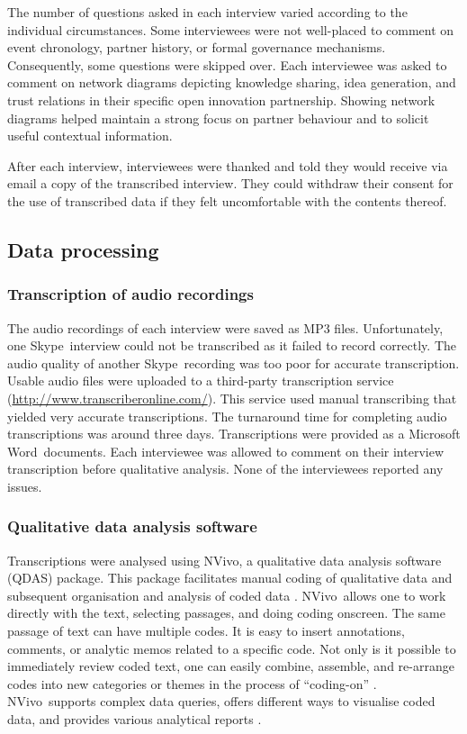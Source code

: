 The number of questions asked in each interview varied according to the individual circumstances. Some interviewees were not well-placed to comment on event chronology, partner history, or formal governance mechanisms. Consequently, some questions were skipped over. Each interviewee was asked to comment on network diagrams depicting knowledge sharing, idea generation, and trust relations in their specific open innovation partnership. Showing network diagrams helped maintain a strong focus on partner behaviour and to solicit useful contextual information. \medskip

After each interview, interviewees were thanked and told they would receive via email a copy of the transcribed interview. They could withdraw their consent for the use of transcribed data if they felt uncomfortable with the contents thereof. 

\subsection{Data processing}

\subsubsection{Transcription of audio recordings}

The audio recordings of each interview were saved as MP3 files. Unfortunately, one Skype\texttrademark\ interview could not be transcribed as it failed to record correctly. The audio quality of another Skype\texttrademark\ recording was too poor for accurate transcription. Usable audio files were uploaded to a third-party transcription service (\url{http://www.transcriberonline.com/}). This service used manual transcribing that yielded very accurate transcriptions. The turnaround time for completing audio transcriptions was around three days. Transcriptions were provided as a Microsoft Word\texttrademark\ documents. Each interviewee was allowed to comment on their interview transcription before qualitative analysis. None of the interviewees reported any issues. 

\subsubsection{Qualitative data analysis software}

Transcriptions were analysed using NVivo\texttrademark, a qualitative data analysis software (QDAS) package. This package facilitates manual coding of qualitative data and subsequent organisation and analysis of coded data \citep{bazeley2013qualitative}. NVivo\texttrademark\ allows one to work directly with the text, selecting passages, and doing coding onscreen. The same passage of text can have multiple codes. It is easy to insert annotations, comments, or analytic memos related to a specific code. Not only is it possible to immediately review coded text, one can easily combine, assemble, and re-arrange codes into new categories or themes in the process of \enquote{coding\hyp{}on} \citep{richards2012readme}. NVivo\texttrademark\ supports complex data queries, offers different ways to visualise coded data, and provides various analytical reports \citep{bazeley2013qualitative}. 


